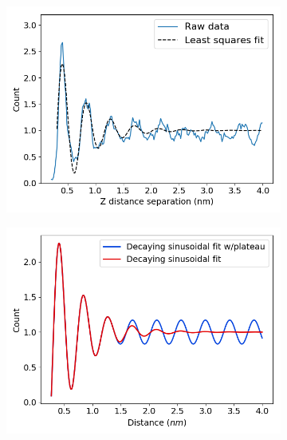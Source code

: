 \documentclass[journal=jpcbfk,manusciprt=article]{achemso}
\begin{document}
  \begin{figure}[!htb]
  \centering
  \begin{subfigure}{0.32\textwidth}
  \includegraphics[width=\textwidth]{z_correlation_layered_sinefit.png}
  \caption{}\label{fig:z_correlation}
  \end{subfigure}
  \begin{subfigure}{0.32\textwidth}
  \includegraphics[width=\textwidth]{theoretical_correlation_functions.png}
  \caption{}\label{fig:theoretical_correlation_functions}
  \end{subfigure}
  \begin{subfigure}{0.32\textwidth}

\end{subfigure}
\end{figure}
\end{document}
